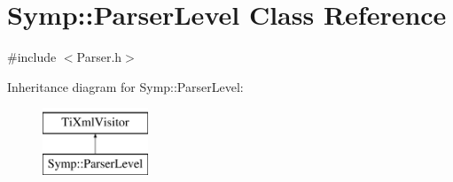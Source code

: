 \hypertarget{struct_symp_1_1_parser_level}{\section{Symp\-:\-:Parser\-Level Class Reference}
\label{struct_symp_1_1_parser_level}
}


{\ttfamily \#include $<$Parser.\-h$>$}

Inheritance diagram for Symp\-:\-:Parser\-Level\-:\begin{figure}[H]
\begin{center}
\leavevmode
\includegraphics[height=2.000000cm]{struct_symp_1_1_parser_level}
\end{center}
\end{figure}
